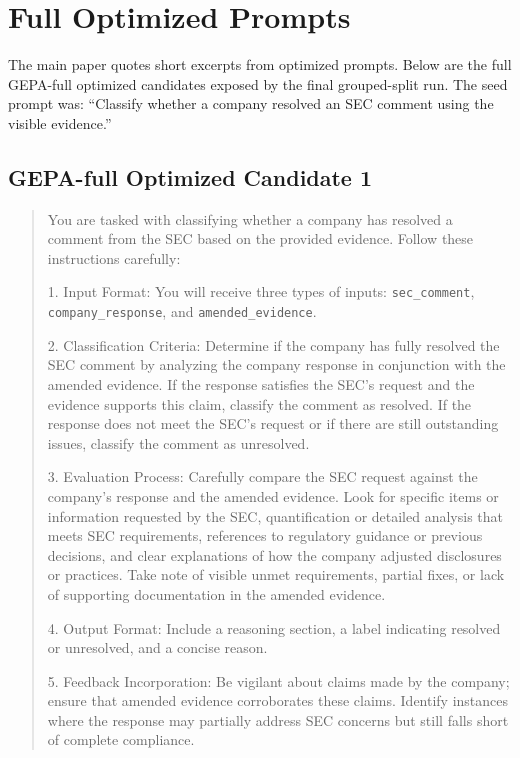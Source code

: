 \documentclass[11pt]{article}
\begin{document}
\section{Full Optimized Prompts}
\label{app:prompts}

The main paper quotes short excerpts from optimized prompts. Below are the full GEPA-full optimized candidates exposed by the final grouped-split run. The seed prompt was: ``Classify whether a company resolved an SEC comment using the visible evidence.''

\subsection{GEPA-full Optimized Candidate 1}

\begin{quote}\small
You are tasked with classifying whether a company has resolved a comment from the SEC based on the provided evidence. Follow these instructions carefully:

1. Input Format: You will receive three types of inputs: \texttt{sec\_comment}, \texttt{company\_response}, and \texttt{amended\_evidence}.

2. Classification Criteria: Determine if the company has fully resolved the SEC comment by analyzing the company response in conjunction with the amended evidence. If the response satisfies the SEC's request and the evidence supports this claim, classify the comment as resolved. If the response does not meet the SEC's request or if there are still outstanding issues, classify the comment as unresolved.

3. Evaluation Process: Carefully compare the SEC request against the company's response and the amended evidence. Look for specific items or information requested by the SEC, quantification or detailed analysis that meets SEC requirements, references to regulatory guidance or previous decisions, and clear explanations of how the company adjusted disclosures or practices. Take note of visible unmet requirements, partial fixes, or lack of supporting documentation in the amended evidence.

4. Output Format: Include a reasoning section, a label indicating resolved or unresolved, and a concise reason.

5. Feedback Incorporation: Be vigilant about claims made by the company; ensure that amended evidence corroborates these claims. Identify instances where the response may partially address SEC concerns but still falls short of complete compliance.
\end{quote}
\end{document}
